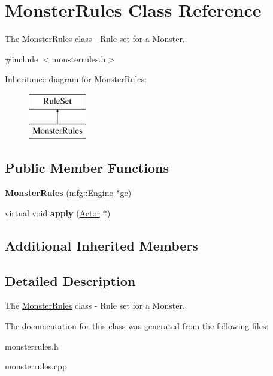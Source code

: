 \hypertarget{class_monster_rules}{}\section{Monster\+Rules Class Reference}
\label{class_monster_rules}


The \hyperlink{class_monster_rules}{Monster\+Rules} class -\/ Rule set for a Monster.  




{\ttfamily \#include $<$monsterrules.\+h$>$}

Inheritance diagram for Monster\+Rules\+:\begin{figure}[H]
\begin{center}
\leavevmode
\includegraphics[height=2.000000cm]{class_monster_rules}
\end{center}
\end{figure}
\subsection*{Public Member Functions}
\begin{DoxyCompactItemize}
\item 
\mbox{\label{class_monster_rules_a054cd4fe8f7aef6b17e5338c7d298582}} 
{\bfseries Monster\+Rules} (\hyperlink{classmfg_1_1_engine}{mfg\+::\+Engine} $\ast$ge)
\item 
\mbox{\label{class_monster_rules_afeaa7b20a44ec650f48e53a81639d7b4}} 
virtual void {\bfseries apply} (\hyperlink{class_actor}{Actor} $\ast$)
\end{DoxyCompactItemize}
\subsection*{Additional Inherited Members}


\subsection{Detailed Description}
The \hyperlink{class_monster_rules}{Monster\+Rules} class -\/ Rule set for a Monster. 

The documentation for this class was generated from the following files\+:\begin{DoxyCompactItemize}
\item 
monsterrules.\+h\item 
monsterrules.\+cpp\end{DoxyCompactItemize}
